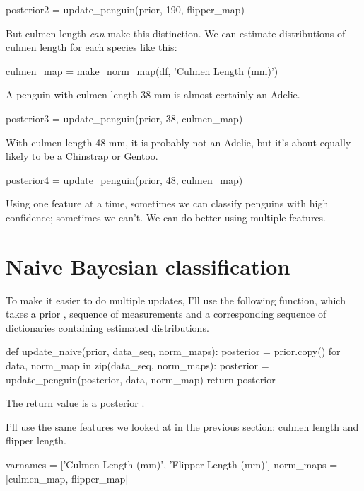\documentclass[12pt]{book}
\theoremstyle{exercise}
\begin{document}
\begin{code}
posterior2 = update_penguin(prior, 190, flipper_map)
\end{code}

But culmen length \emph{can} make this distinction. We can estimate
distributions of culmen length for each species like this:

\begin{code}
culmen_map = make_norm_map(df, 'Culmen Length (mm)')
\end{code}

A penguin with culmen length 38 mm is almost certainly an Adelie.

\begin{code}
posterior3 = update_penguin(prior, 38, culmen_map)
\end{code}

With culmen length 48 mm, it is probably not an Adelie, but it's about
equally likely to be a Chinstrap or Gentoo.

\begin{code}
posterior4 = update_penguin(prior, 48, culmen_map)
\end{code}

Using one feature at a time, sometimes we can classify penguins with
high confidence; sometimes we can't. We can do better using multiple
features.

\section{Naive Bayesian classification}
\label{naive-bayesian-classification}

To make it easier to do multiple updates, I'll use the following
function, which takes a prior , sequence of
measurements and a corresponding sequence of dictionaries containing
estimated distributions.

\begin{code}
def update_naive(prior, data_seq, norm_maps):
    posterior = prior.copy()
    for data, norm_map in zip(data_seq, norm_maps):
        posterior = update_penguin(posterior, data, norm_map)
    return posterior
\end{code}

The return value is a posterior .

I'll use the same features we looked at in the previous section: culmen
length and flipper length.

\begin{code}
varnames = ['Culmen Length (mm)', 'Flipper Length (mm)']
norm_maps = [culmen_map, flipper_map]
\end{code}
\end{document}
